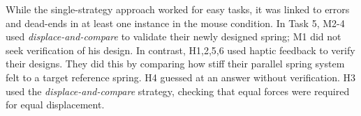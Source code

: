 While the single-strategy approach worked for easy tasks, it was linked to errors and dead-ends in at least one instance in the mouse condition.
In Task 5, M2-4 used  \textit{displace-and-compare}  to validate their newly designed spring; M1 did not seek verification of his design.
In contrast, H1,2,5,6 used haptic feedback to verify their designs. %
They did this by comparing how stiff their parallel spring system felt to a target reference spring. 
H4 guessed at an answer without verification.
H3 used the \textit{displace-and-compare} strategy, checking that equal forces were required for equal displacement. %




